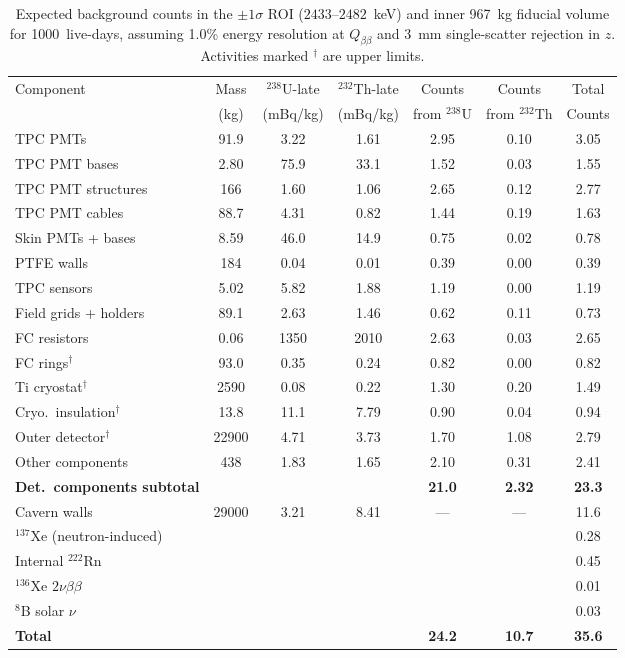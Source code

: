 \documentclass[11pt]{article}
\begin{document}
\begin{table}[h]
\centering
\caption{Expected background counts in the $\pm 1\sigma$ ROI
  ($2433$--$2482$~keV) and inner 967~kg fiducial volume for
  1000~live-days, assuming 1.0\% energy resolution at $Q_{\beta\beta}$
  and 3~mm single-scatter rejection in $z$.  Activities marked
  $^\dagger$ are upper limits.}
\label{tab:backgrounds}
\begin{tabular}{@{}lS[table-format=5.0]S[table-format=4.1]S[table-format=4.1]S[table-format=2.2]S[table-format=2.2]S[table-format=2.2]@{}}
\toprule
{Component} & {Mass} & {$^{238}$U-late} & {$^{232}$Th-late} &
  {Counts} & {Counts} & {Total} \\
 & {(kg)} & {(mBq/kg)} & {(mBq/kg)} &
  {from $^{238}$U} & {from $^{232}$Th} & {Counts} \\
\midrule
TPC PMTs          &   91.9 &   3.22 &   1.61 & 2.95 & 0.10 & 3.05 \\
TPC PMT bases     &    2.80 &  75.9  &  33.1  & 1.52 & 0.03 & 1.55 \\
TPC PMT structures&  166   &   1.60 &   1.06 & 2.65 & 0.12 & 2.77 \\
TPC PMT cables    &   88.7 &   4.31 &   0.82 & 1.44 & 0.19 & 1.63 \\
Skin PMTs + bases &    8.59 &  46.0  &  14.9  & 0.75 & 0.02 & 0.78 \\
PTFE walls        &  184   &   0.04 &   0.01 & 0.39 & 0.00 & 0.39 \\
TPC sensors       &    5.02 &   5.82 &   1.88 & 1.19 & 0.00 & 1.19 \\
Field grids + holders & 89.1 & 2.63 &   1.46 & 0.62 & 0.11 & 0.73 \\
FC resistors      &    0.06 & 1350   & 2010   & 2.63 & 0.03 & 2.65 \\
FC rings$^\dagger$ &  93.0 &   0.35 &   0.24 & 0.82 & 0.00 & 0.82 \\
Ti cryostat$^\dagger$ & 2590 & 0.08 &  0.22  & 1.30 & 0.20 & 1.49 \\
Cryo.\ insulation$^\dagger$ & 13.8 & 11.1 & 7.79 & 0.90 & 0.04 & 0.94 \\
Outer detector$^\dagger$ & 22900 & 4.71 & 3.73 & 1.70 & 1.08 & 2.79 \\
Other components  &  438   &   1.83 &   1.65 & 2.10 & 0.31 & 2.41 \\
\midrule
\textbf{Det.\ components subtotal} & & & & \textbf{21.0} & \textbf{2.32} & \textbf{23.3} \\
\midrule
Cavern walls      & 29000  &   3.21 &   8.41 &  {---} & {---} & 11.6 \\
$^{137}$Xe (neutron-induced) & & & & & & 0.28 \\
Internal $^{222}$Rn & & & & & & 0.45 \\
$^{136}$Xe $2\nu\beta\beta$ & & & & & & 0.01 \\
$^{8}$B solar $\nu$ & & & & & & 0.03 \\
\midrule
\textbf{Total}    &        &        &        & \textbf{24.2} & \textbf{10.7} & \textbf{35.6} \\
\bottomrule
\end{tabular}
\end{table}
\end{document}
